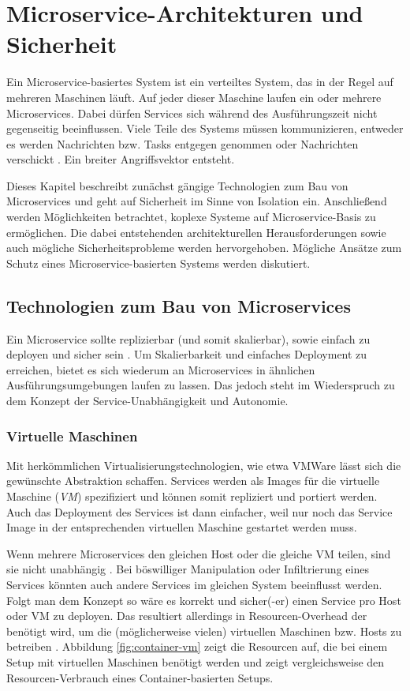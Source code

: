 \section{Microservice-Architekturen und Sicherheit}

Ein Microservice-basiertes System ist ein verteiltes System, das in der Regel auf mehreren Maschinen läuft. Auf jeder dieser Maschine laufen ein oder mehrere Microservices. Dabei dürfen Services sich während des Ausführungszeit nicht gegenseitig beeinflussen. Viele Teile des Systems müssen kommunizieren, entweder es werden Nachrichten bzw. Tasks entgegen genommen oder Nachrichten verschickt \cite{newman2015}. Ein breiter Angriffsvektor entsteht.

Dieses Kapitel beschreibt zunächst gängige Technologien zum Bau von Microservices und geht auf Sicherheit im Sinne von Isolation ein. Anschließend werden Möglichkeiten betrachtet, koplexe Systeme auf Microservice-Basis zu ermöglichen. Die dabei entstehenden architekturellen Herausforderungen sowie auch mögliche Sicherheitsprobleme werden hervorgehoben. Mögliche Ansätze zum Schutz eines Microservice-basierten Systems werden diskutiert.


\subsection{Technologien zum Bau von Microservices}

Ein Microservice sollte replizierbar (und somit skalierbar), sowie einfach zu deployen und sicher sein \cite{newman2015,microservicesIO}. Um Skalierbarkeit und einfaches Deployment zu erreichen, bietet es sich wiederum an Microservices in ähnlichen Ausführungsumgebungen laufen zu lassen. Das jedoch steht im Wiederspruch zu dem Konzept der Service-Unabhängigkeit und Autonomie. 

\subsubsection{Virtuelle Maschinen}
Mit herkömmlichen Virtualisierungstechnologien, wie etwa VMWare lässt sich die gewünschte Abstraktion schaffen. Services werden als Images für die virtuelle Maschine (\textit{VM}) spezifiziert und können somit repliziert und portiert werden. Auch das Deployment des Services ist dann einfacher, weil nur noch das Service Image in der entsprechenden virtuellen Maschine gestartet werden muss.

Wenn mehrere Microservices den gleichen Host oder die gleiche VM teilen, sind sie nicht unabhängig \cite{microservicesIO}. Bei böswilliger Manipulation oder Infiltrierung eines Services könnten auch andere Services im gleichen System beeinflusst werden. Folgt man dem Konzept so wäre es korrekt und sicher(-er) einen Service pro Host oder VM zu deployen. Das resultiert allerdings in Resourcen-Overhead der benötigt wird, um die (möglicherweise vielen) virtuellen Maschinen bzw. Hosts zu betreiben \cite{newman2015}. Abbildung \ref{fig:container-vm} zeigt die Resourcen auf, die bei einem Setup mit virtuellen Maschinen benötigt werden und zeigt vergleichsweise den Resourcen-Verbrauch eines Container-basierten Setups.

